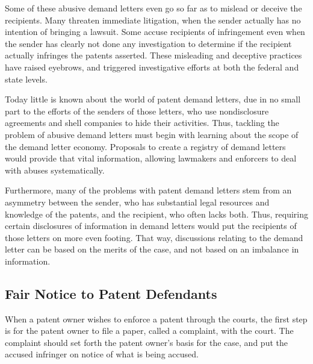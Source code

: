 \documentclass[11pt,twocolumn,titlepage]{article}
\begin{document}
Some of these abusive demand letters even go so far as to mislead or deceive the
recipients. Many threaten immediate litigation, when the sender actually has no
intention of bringing a lawsuit. Some accuse recipients of infringement even
when the sender has clearly not done any investigation to determine if the
recipient actually infringes the patents asserted.
These misleading and
deceptive practices have raised eyebrows, and triggered investigative efforts at
both the federal and state levels.

Today little is known about the world of patent demand letters, due in no small
part to the efforts of the senders of those letters, who use nondisclosure
agreements and shell companies to hide their activities.
Thus, tackling the problem of abusive demand letters must begin with learning
about the scope of the demand letter economy. Proposals to create a registry of
demand letters would provide that vital information, allowing lawmakers and
enforcers to deal with abuses systematically.

Furthermore, many of the problems with patent demand letters stem from an
asymmetry between the sender, who has substantial legal resources and knowledge
of the patents, and the recipient, who often lacks both. Thus, requiring certain
disclosures of information in demand letters
would
put the recipients of those
letters on more even footing.
That way, discussions relating to the demand
letter can be based on the merits of the case, and not based on an imbalance in
information.

\subsection{Fair Notice to Patent Defendants}
\SectionNote

When a patent owner wishes to enforce a patent through the courts, the first
step is for the patent owner to file a paper, called a complaint, with the
court. The complaint should set forth the patent owner's basis for the case, and
put the accused infringer on notice of what is being accused.
\end{document}
